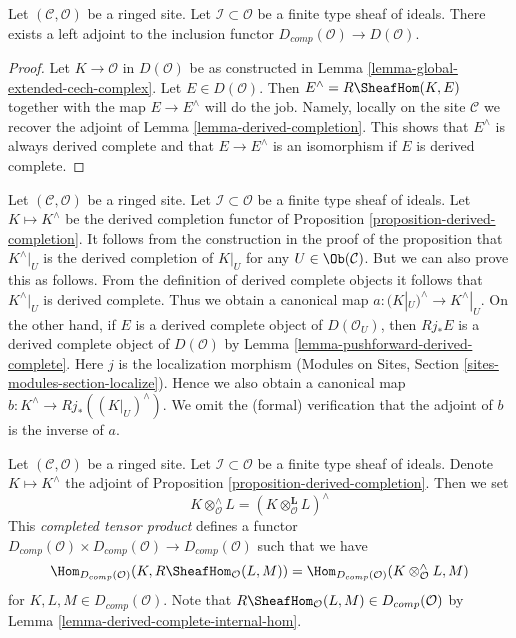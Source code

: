 \begin{proposition}
\label{proposition-derived-completion}
Let $(\mathcal{C}, \mathcal{O})$ be a ringed site.
Let $\mathcal{I} \subset \mathcal{O}$ be a finite type sheaf of
ideals. There exists a left adjoint to the inclusion
functor $D_{comp}(\mathcal{O}) \to D(\mathcal{O})$.
\end{proposition}

\begin{proof}
Let $K \to \mathcal{O}$ in $D(\mathcal{O})$ be as constructed in
Lemma \ref{lemma-global-extended-cech-complex}. Let $E \in D(\mathcal{O})$.
Then $E^\wedge = R\SheafHom(K, E)$ together with the map $E \to E^\wedge$
will do the job. Namely, locally on the site $\mathcal{C}$ we
recover the adjoint of Lemma \ref{lemma-derived-completion}.
This shows that $E^\wedge$ is always derived complete and that
$E \to E^\wedge$ is an isomorphism if $E$ is derived complete.
\end{proof}

\begin{remark}
\label{remark-localization-and-completion}
Let $(\mathcal{C}, \mathcal{O})$ be a ringed site.
Let $\mathcal{I} \subset \mathcal{O}$ be a finite type sheaf of
ideals. Let $K \mapsto K^\wedge$ be the derived completion functor
of Proposition \ref{proposition-derived-completion}. It follows
from the construction in the proof of the proposition that $K^\wedge|_U$
is the derived completion of $K|_U$ for any $U \in \Ob(\mathcal{C})$.
But we can also prove this as follows. From the definition
of derived complete objects it follows that $K^\wedge|_U$ is derived complete.
Thus we obtain a canonical map $a : (K|_U)^\wedge \to K^\wedge|_U$.
On the other hand, if $E$ is a derived complete object of
$D(\mathcal{O}_U)$, then $Rj_*E$ is a derived complete object of
$D(\mathcal{O})$ by Lemma \ref{lemma-pushforward-derived-complete}.
Here $j$ is the localization morphism
(Modules on Sites, Section \ref{sites-modules-section-localize}).
Hence we also obtain a canonical
map $b : K^\wedge \to Rj_*((K|_U)^\wedge)$. We omit the (formal) verification
that the adjoint of $b$ is the inverse of $a$.
\end{remark}

\begin{remark}
\label{remark-completed-tensor-product}
Let $(\mathcal{C}, \mathcal{O})$ be a ringed site. Let
$\mathcal{I} \subset \mathcal{O}$ be a finite type sheaf of ideals. 
Denote $K \mapsto K^\wedge$ the adjoint of
Proposition \ref{proposition-derived-completion}.
Then we set
$$
K \otimes^\wedge_\mathcal{O} L = (K \otimes_\mathcal{O}^\mathbf{L} L)^\wedge
$$
This {\it completed tensor product} defines a functor
$D_{comp}(\mathcal{O}) \times D_{comp}(\mathcal{O}) \to D_{comp}(\mathcal{O})$
such that we have
$$
\Hom_{D_{comp}(\mathcal{O})}(K, R\SheafHom_\mathcal{O}(L, M))
=
\Hom_{D_{comp}(\mathcal{O})}(K \otimes_\mathcal{O}^\wedge L, M)
$$
for $K, L, M \in D_{comp}(\mathcal{O})$. Note that
$R\SheafHom_\mathcal{O}(L, M) \in D_{comp}(\mathcal{O})$ by
Lemma \ref{lemma-derived-complete-internal-hom}.
\end{remark}

